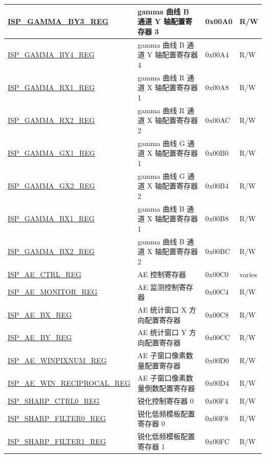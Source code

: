 \begin{longtable}{ | p{6cm} | p{7.2cm} | p{1.3cm} | p{1cm} | }
\hyperref[regdesc:ISPGAMMABY3REG]{ISP\_GAMMA\_BY3\_REG} & gamma 曲线 B 通道 Y 轴配置寄存器 3 & 0x00A0 & R/W \\ \hline
\hyperref[regdesc:ISPGAMMABY4REG]{ISP\_GAMMA\_BY4\_REG} & gamma 曲线 B 通道 Y 轴配置寄存器 4 & 0x00A4 & R/W \\ \hline
\hyperref[regdesc:ISPGAMMARX1REG]{ISP\_GAMMA\_RX1\_REG} & gamma 曲线 R 通道 X 轴配置寄存器 1 & 0x00A8 & R/W \\ \hline
\hyperref[regdesc:ISPGAMMARX2REG]{ISP\_GAMMA\_RX2\_REG} & gamma 曲线 R 通道 X 轴配置寄存器 2 & 0x00AC & R/W \\ \hline
\hyperref[regdesc:ISPGAMMAGX1REG]{ISP\_GAMMA\_GX1\_REG} & gamma 曲线 G 通道 X 轴配置寄存器 1 & 0x00B0 & R/W \\ \hline
\hyperref[regdesc:ISPGAMMAGX2REG]{ISP\_GAMMA\_GX2\_REG} & gamma 曲线 G 通道 X 轴配置寄存器 2 & 0x00B4 & R/W \\ \hline
\hyperref[regdesc:ISPGAMMABX1REG]{ISP\_GAMMA\_BX1\_REG} & gamma 曲线 B 通道 X 轴配置寄存器 1 & 0x00B8 & R/W \\ \hline
\hyperref[regdesc:ISPGAMMABX2REG]{ISP\_GAMMA\_BX2\_REG} & gamma 曲线 B 通道 X 轴配置寄存器 2 & 0x00BC & R/W \\ \hline
\hyperref[regdesc:ISPAECTRLREG]{ISP\_AE\_CTRL\_REG} & AE 控制寄存器 & 0x00C0 & varies \\ \hline
\hyperref[regdesc:ISPAEMONITORREG]{ISP\_AE\_MONITOR\_REG} & AE 监测控制寄存器 & 0x00C4 & R/W \\ \hline
\hyperref[regdesc:ISPAEBXREG]{ISP\_AE\_BX\_REG} & AE 统计窗口 X 方向配置寄存器 & 0x00C8 & R/W \\ \hline
\hyperref[regdesc:ISPAEBYREG]{ISP\_AE\_BY\_REG} & AE 统计窗口 Y 方向配置寄存器 & 0x00CC & R/W \\ \hline
\hyperref[regdesc:ISPAEWINPIXNUMREG]{ISP\_AE\_WINPIXNUM\_REG} & AE 子窗口像素数量配置寄存器 & 0x00D0 & R/W \\ \hline
\hyperref[regdesc:ISPAEWINRECIPROCALREG]{ISP\_AE\_WIN\_RECIPROCAL\_REG} & AE 子窗口像素数量倒数配置寄存器 & 0x00D4 & R/W \\ \hline
\hyperref[regdesc:ISPSHARPCTRL0REG]{ISP\_SHARP\_CTRL0\_REG} & 锐化控制寄存器 0 & 0x00F4 & R/W \\ \hline
\hyperref[regdesc:ISPSHARPFILTER0REG]{ISP\_SHARP\_FILTER0\_REG} & 锐化低频模板配置寄存器 0 & 0x00F8 & R/W \\ \hline
\hyperref[regdesc:ISPSHARPFILTER1REG]{ISP\_SHARP\_FILTER1\_REG} & 锐化低频模板配置寄存器 1 & 0x00FC & R/W \\ \hline

\end{longtable}
